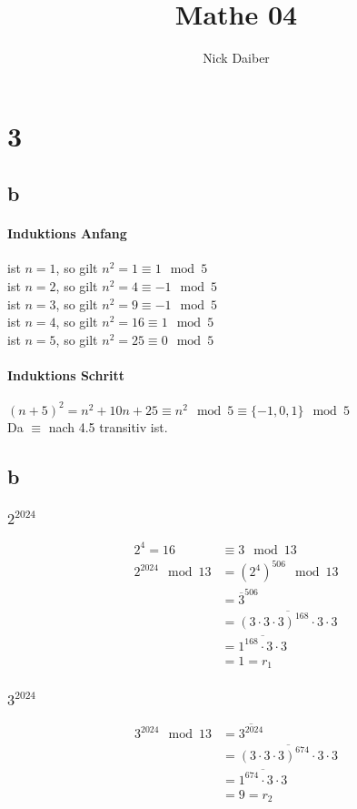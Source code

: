 \documentclass{article}
\author{Nick Daiber}
\title{Mathe 04}
\begin{document}
\maketitle
\section*{3}
\subsection*{b}
\paragraph{Induktions Anfang\\}
ist $n = 1$, so gilt $n^2 = 1 \equiv 1 \mod 5$\\
ist $n = 2$, so gilt $n^2 = 4 \equiv -1 \mod 5$\\
ist $n = 3$, so gilt $n^2 = 9 \equiv -1 \mod 5$\\
ist $n = 4$, so gilt $n^2 = 16 \equiv 1 \mod 5$\\
ist $n = 5$, so gilt $n^2 = 25 \equiv 0 \mod 5$
\paragraph{Induktions Schritt\\}
$(n+5)^2=n^2+10n+25\equiv n^2 \mod 5 \equiv \{-1,0,1\}\mod 5$\\
Da $\equiv$ nach 4.5 transitiv ist.
\subsection*{b}
\subsubsection*{$2^{2024}$}
\begin{align*}
    2^4 = 16 &\equiv 3 \mod 13\\
    2^{2024}\mod 13&=(2^4)^{506}\mod 13\\
    &=\overline{3}^{506}\\
    &=\overline{(3\cdot 3\cdot 3)^{168}\cdot 3\cdot 3}\\
    &=\overline{1^{168}\cdot 3\cdot 3}\\
    &=1=r_1
\end{align*}
\subsubsection*{$3^{2024}$}
\begin{align*}
    3^{2024}\mod 13&=\overline{3^{2024}}\\
    &=\overline{(3\cdot 3\cdot 3)^{674}\cdot 3\cdot 3}\\
    &=\overline{1^{674}\cdot 3\cdot 3}\\
    &=9=r_2
\end{align*}
\end{document}
